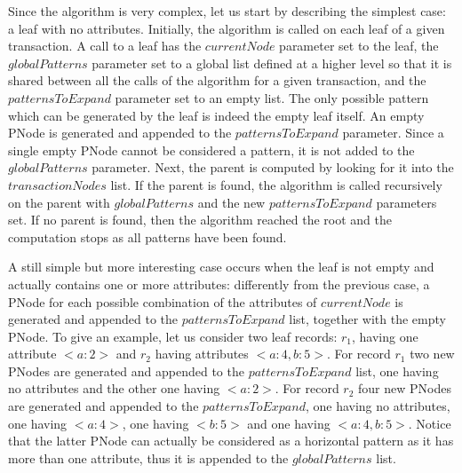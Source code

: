 \documentclass{acm_proc_article-sp-sigmod09}
\begin{document}
Since the algorithm is very complex, let us start by describing the simplest case: a leaf with no attributes. Initially, the algorithm is called on each leaf of a given transaction. A call to a leaf has the $currentNode$ parameter set to the leaf, the $globalPatterns$ parameter set to a global list defined at a higher level so that it is shared between all the calls of the algorithm for a given transaction, and the $patternsToExpand$ parameter set to an empty list. The only possible pattern which can be generated by the leaf is indeed the empty leaf itself. An empty PNode is generated and appended to the $patternsToExpand$ parameter. Since a single empty PNode cannot be considered a pattern, it is not added to the $globalPatterns$ parameter. Next, the parent is computed by looking for it into the $transactionNodes$ list. If the parent is found, the algorithm is called recursively on the parent with $globalPatterns$ and the new $patternsToExpand$ parameters set. If no parent is found, then the algorithm reached the root and the computation stops as all patterns have been found.

A still simple but more interesting case occurs when the leaf is not empty and actually contains one or more attributes: differently from the previous case, a PNode for each possible combination of the attributes of $currentNode$ is generated and appended to the $patternsToExpand$ list, together with the empty PNode. To give an example, let us consider two leaf records: $r_1$, having one attribute $<a \colon 2>$ and $r_2$ having attributes $<a \colon 4, b \colon 5>$. For record $r_1$ two new PNodes are generated and appended to the $patternsToExpand$ list, one having no attributes and the other one having $<a \colon 2>$. For record $r_2$ four new PNodes are generated and appended to the $patternsToExpand$, one having no attributes, one having $<a \colon 4>$, one having $<b \colon 5>$ and one having $<a \colon 4, b \colon 5>$. Notice that the latter PNode can actually be considered as a horizontal pattern as it has more than one attribute, thus it is appended to the $globalPatterns$ list. 
\end{document}
